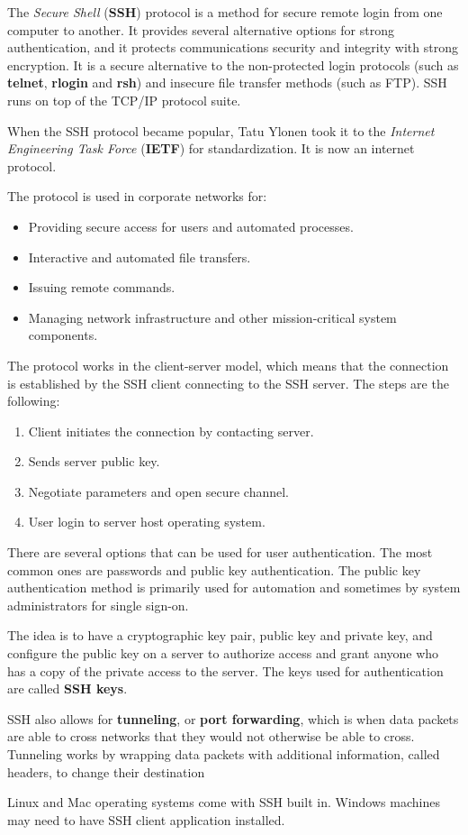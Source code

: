 The \textit{Secure Shell} (\textbf{SSH}) protocol is a method for secure remote login from one computer to another. It provides several alternative options for strong authentication, and it protects communications security and integrity with strong encryption. It is a secure alternative to the non-protected login protocols (such as \textbf{telnet}, \textbf{rlogin} and \textbf{rsh}) and insecure file transfer methods (such as FTP). SSH runs on top of the TCP/IP protocol suite.

When the SSH protocol became popular, Tatu Ylonen took it to the \textit{Internet Engineering Task Force} (\textbf{IETF}) for standardization. It is now an internet protocol.

The protocol is used in corporate networks for:

\begin{itemize}
  \item Providing secure access for users and automated processes.
  \item Interactive and automated file transfers.
  \item Issuing remote commands.
  \item Managing network infrastructure and other mission-critical system components.
\end{itemize}

The protocol works in the client-server model, which means that the connection is established by the SSH client connecting to the SSH server. The steps are the following:

\begin{enumerate}
  \item Client initiates the connection by contacting server.
  \item Sends server public key.
  \item Negotiate parameters and open secure channel.
  \item User login to server host operating system.
\end{enumerate}

There are several options that can be used for user authentication. The most common ones are passwords and public key authentication. The public key authentication method is primarily used for automation and sometimes by system administrators for single sign-on.

The idea is to have a cryptographic key pair, public key and private key, and configure the public key on a server to authorize access and grant anyone who has a copy of the private access to the server. The keys used for authentication are called \textbf{SSH keys}.

SSH also allows for \textbf{tunneling}, or \textbf{port forwarding}, which is when data packets are able to cross networks that they would not otherwise be able to cross. Tunneling works by wrapping data packets with additional information, called headers, to change their destination

Linux and Mac operating systems come with SSH built in. Windows machines may need to have SSH client application installed.
